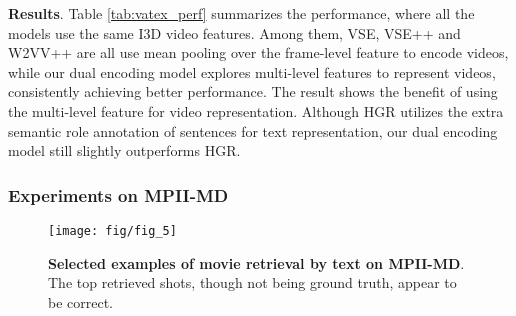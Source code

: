 \textbf{Results}.
Table \ref{tab:vatex_perf} summarizes the performance, where all the models use the same I3D \cite{carreira2017quo} video features. Among them, VSE, VSE++ and W2VV++ are all use mean pooling over the frame-level feature to encode videos, while our dual encoding model explores multi-level features to represent videos, consistently achieving better performance. The result shows the benefit of using the multi-level feature for video representation.
Although HGR utilizes the extra semantic role annotation of sentences for text representation, our dual encoding model still slightly outperforms HGR. 



\subsubsection{Experiments on MPII-MD}


\begin{table} [tb!]
\renewcommand{\arraystretch}{1.2}
\caption{\textbf{State-of-the-art on MPII-MD}. Our proposed model performs the best.}
\label{tab:mpii_perf}
\centering 
{}\end{table}




\begin{figure}[tb!]
\centering
\texttt{[image: fig/fig\_5]}
\caption{\textbf{Selected examples of movie retrieval by text on MPII-MD}. The top retrieved shots, though not being ground truth, appear to be correct.}
\vspace{-4mm}
\label{fig:mpii-md}
\end{figure}



